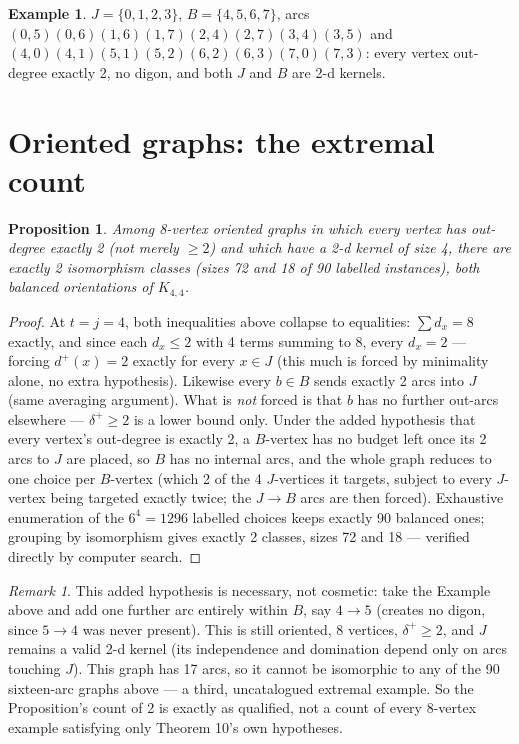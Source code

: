 \documentclass[11pt]{article}
\theoremstyle{plain}
\newtheorem{proposition}[theorem]{Proposition}
\theoremstyle{definition}
\newtheorem{example}[theorem]{Example}
\theoremstyle{remark}
\newtheorem*{remark}{Remark}
\begin{document}
\begin{example}
$J=\{0,1,2,3\}$, $B=\{4,5,6,7\}$, arcs $(0,5)(0,6)(1,6)(1,7)(2,4)(2,7)(3,4)(3,5)$ and
$(4,0)(4,1)(5,1)(5,2)(6,2)(6,3)(7,0)(7,3)$: every vertex out-degree exactly 2, no
digon, and both $J$ and $B$ are 2-d kernels.
\end{example}

\section{Oriented graphs: the extremal count}

\begin{proposition}
Among 8-vertex oriented graphs in which \emph{every} vertex has out-degree
\emph{exactly} 2 (not merely $\ge2$) and which have a 2-d kernel of size 4, there are
exactly 2 isomorphism classes (sizes 72 and 18 of 90 labelled instances), both
balanced orientations of $K_{4,4}$.
\end{proposition}

\begin{proof}
At $t=j=4$, both inequalities above collapse to equalities: $\sum d_x=8$ exactly,
and since each $d_x\le2$ with 4 terms summing to 8, every $d_x=2$ — forcing
$d^+(x)=2$ exactly for every $x\in J$ (this much is forced by minimality alone, no
extra hypothesis). Likewise every $b\in B$ sends exactly 2 arcs into $J$ (same
averaging argument). What is \emph{not} forced is that $b$ has no further out-arcs
elsewhere — $\delta^+\ge2$ is a lower bound only. Under the added hypothesis that
every vertex's out-degree is exactly 2, a $B$-vertex has no budget left once its 2
arcs to $J$ are placed, so $B$ has no internal arcs, and the whole graph reduces to
one choice per $B$-vertex (which 2 of the 4 $J$-vertices it targets, subject to
every $J$-vertex being targeted exactly twice; the $J\to B$ arcs are then forced).
Exhaustive enumeration of the $6^4=1296$ labelled choices keeps exactly 90 balanced
ones; grouping by isomorphism gives exactly 2 classes, sizes 72 and 18 — verified
directly by computer search.
\end{proof}

\begin{remark}
This added hypothesis is necessary, not cosmetic: take the Example above and add one
further arc entirely within $B$, say $4\to5$ (creates no digon, since $5\to4$ was
never present). This is still oriented, 8 vertices, $\delta^+\ge2$, and $J$ remains
a valid 2-d kernel (its independence and domination depend only on arcs touching $J$).
This graph has 17 arcs, so it cannot be isomorphic to any of the 90 sixteen-arc
graphs above — a third, uncatalogued extremal example. So the Proposition's count of
2 is exactly as qualified, not a count of every 8-vertex example satisfying only
Theorem 10's own hypotheses.
\end{remark}
\end{document}
